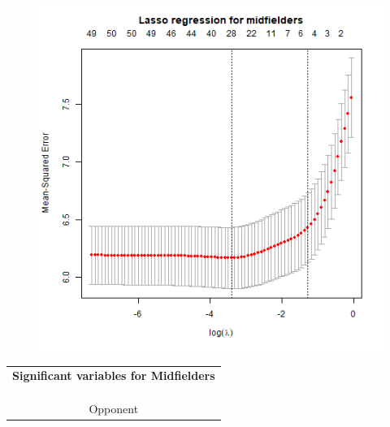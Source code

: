 \begin{table}[H]
\centering
\begin{minipage}{.5\textwidth}
  \centering
  \captionsetup{justification=centering}
    \begin{figure}[H]
        \centering
        \includegraphics[scale=0.4]{fig/chapter_6/lasso_MID.png}
    \end{figure}
    \label{fig:lasso_MID_1}
\end{minipage}%
\begin{minipage}{.5\textwidth}
  \centering
  \captionsetup{justification=centering}
    \begin{tabular}{c}
    \\
    \textbf{Significant variables for Midfielders }\\
    \\
    \\
    \\
   Opponent                              \\

\end{tabular}
\end{minipage}
\end{table}
